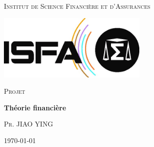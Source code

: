 \begin{titlepage}
	\centering

	{\scshape\LARGE Institut de Science Financière et d'Assurances	 \par}\vspace{1cm}
   	 \includegraphics[width=0.55\textwidth]{logo_isfa}\par
	\vspace{1.5cm}
	{\scshape\Large Projet\par}
	\vspace{1.5cm}
	{\huge\bfseries Théorie financière\par}
	\vspace{2cm}{W. LAURENT, O. LAVERNY, P. MARJOLLET\par}
	\vfill
	\par
	\textsc{Pr. JIAO YING}

	\vfill

	{\large \today\par}
\end{titlepage}